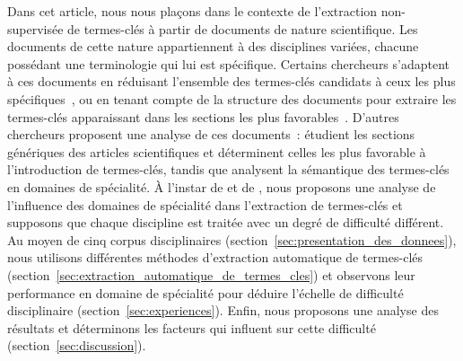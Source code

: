   Dans cet article, nous nous plaçons dans le contexte de l'extraction
  non-supervisée de termes-clés à partir de documents de nature scientifique.
  Les documents de cette nature appartiennent à des disciplines variées, chacune
  possédant une terminologie qui lui est spécifique. Certains chercheurs
  s'adaptent à ces documents en réduisant l'ensemble des termes-clés candidats à
  ceux les plus spécifiques~\cite{kim2009termextraction}, ou en tenant compte de
  la structure des documents pour extraire les termes-clés apparaissant dans les
  sections les plus favorables~\cite{hofmann2009impactofdocumentstructure}.
  D'autres chercheurs proposent une analyse de ces documents~:
   étudient les sections génériques des
  articles scientifiques et déterminent celles les plus favorable à
  l'introduction de termes-clés, tandis que
   analysent la sémantique des
  termes-clés en domaines de spécialité. À l'instar de
   et de
  ,
  nous proposons une analyse de l'influence des domaines de spécialité dans
  l'extraction de termes-clés et supposons que chaque discipline est traitée
  avec un degré de difficulté différent. Au moyen de cinq corpus disciplinaires
  (section~\ref{sec:presentation_des_donnees}), nous utilisons différentes
  méthodes d'extraction automatique de termes-clés
  (section~\ref{sec:extraction_automatique_de_termes_cles}) et observons leur
  performance en domaine de spécialité pour déduire l'échelle de difficulté
  disciplinaire (section~\ref{sec:experiences}). Enfin, nous proposons une
  analyse des résultats et déterminons les facteurs qui influent sur cette
  difficulté (section~\ref{sec:discussion}).

%

